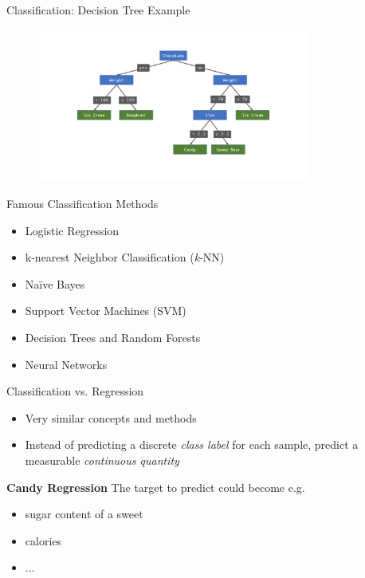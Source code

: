 \documentclass[aspectratio=169]{beamer}
\begin{document}
\begin{frame}{Classification: Decision Tree Example}
    \begin{figure}
        \centering
        \includegraphics[width=0.8\textwidth]{figures/example_decision_tree.pdf}
    \end{figure}
\end{frame}

\begin{frame}{Famous Classification Methods}
    \begin{itemize}
        \item Logistic Regression
        \item k-nearest Neighbor Classification (\textit{k}-NN)
        \item Naïve Bayes
        \item Support Vector Machines (SVM)
        \item Decision Trees and Random Forests
        \item Neural Networks
    \end{itemize}
\end{frame}

\begin{frame}{Classification vs. Regression}
    \begin{itemize}
        \item Very similar concepts and methods
        \item Instead of predicting a discrete \textit{class label} for
          each sample, predict a measurable \textit{continuous quantity}
    \end{itemize}
    \vspace{0.5cm}
    \textbf{Candy Regression}\newline
    The target to predict could become e.g.
    \begin{itemize}
        \item sugar content of a sweet
        \item calories
        \item ...
    \end{itemize}
\end{frame}
\end{document}
